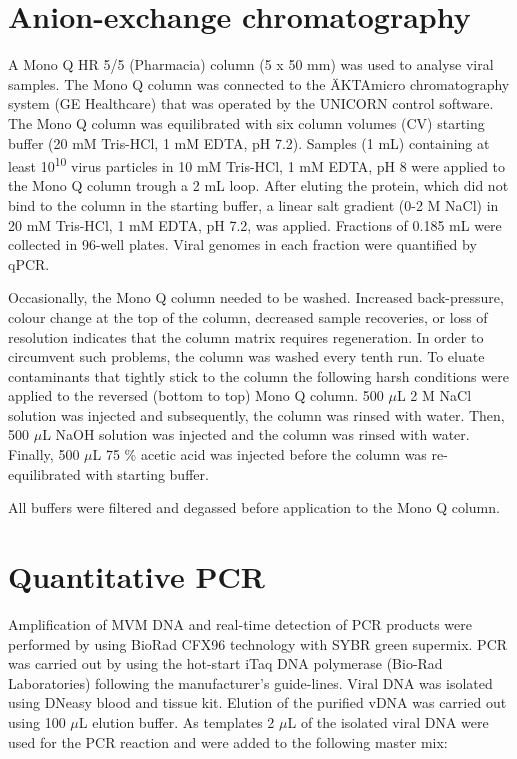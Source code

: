 \section{Anion-exchange chromatography}
A Mono Q HR 5/5 (Pharmacia) column (5 x 50 mm) was used to analyse viral samples. The Mono Q column was connected to the ÄKTAmicro chromatography system (GE Healthcare) that was operated by the UNICORN control software. The Mono Q column was equilibrated with six column volumes (CV) starting buffer (20 mM Tris-HCl, 1 mM EDTA, pH 7.2). Samples (1 mL) containing at least 10\textsuperscript{10} virus particles in 10 mM Tris-HCl, 1 mM EDTA, pH 8 were applied to the Mono Q column trough a 2 mL loop. After eluting the protein, which did not bind to the column in the starting buffer, a linear salt gradient (0-2 M NaCl) in 20 mM Tris-HCl, 1 mM EDTA, pH 7.2, was applied. Fractions of 0.185 mL were collected in 96-well plates. Viral genomes in each fraction were quantified by qPCR.  

Occasionally, the Mono Q column needed to be washed. Increased back-pressure, colour change at the top of the column, decreased sample recoveries, or loss of resolution indicates that the column matrix requires regeneration. In order to circumvent such problems, the column was washed every tenth run. To eluate contaminants that tightly stick to the column the following harsh conditions were applied to the reversed (bottom to top) Mono Q column. 500 $\mu$L 2 M NaCl solution was injected and subsequently, the column was rinsed with water. Then, 500 $\mu$L NaOH solution was injected and the column was rinsed with water. Finally, 500 $\mu$L 75 \% acetic acid was injected before the column was re-equilibrated with starting buffer.             

All buffers were filtered and degassed before application to the Mono Q column.



\section{Quantitative PCR}
Amplification of MVM DNA and real-time detection of PCR products were performed by using BioRad CFX96 technology with SYBR green supermix. PCR was carried out by using the hot-start iTaq\textsuperscript{\texttrademark} DNA polymerase (Bio-Rad Laboratories) following the manufacturer’s guide-lines. Viral DNA was isolated using DNeasy blood and tissue kit. Elution of the purified vDNA was carried out using 100 $\mu$L elution buffer. As templates 2 $\mu$L of the isolated viral DNA were used for the PCR reaction and were added to the following master mix:\\

